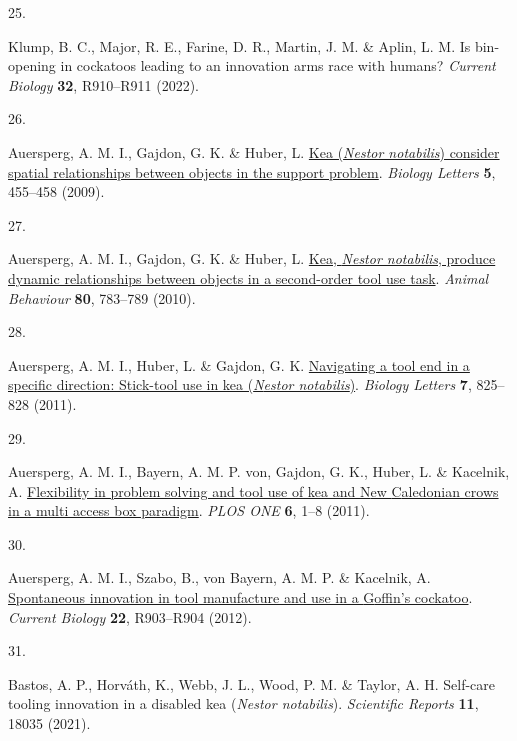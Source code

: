 \documentclass[
  man,floatsintext]{apa6}
\newlength{\cslhangindent}
\newlength{\csllabelwidth}
\newlength{\cslentryspacingunit} %
\newenvironment{CSLReferences}[2] %
 {%
  \setlength{\parindent}{0pt}
  \ifodd #1
  \let\oldpar\par
  \def\par{\hangindent=\cslhangindent\oldpar}
  \fi
  \setlength{\parskip}{#2\cslentryspacingunit}
 }%
 {}
\newcommand{\CSLLeftMargin}[1]{\parbox[t]{\csllabelwidth}{#1}}
\newcommand{\CSLRightInline}[1]{\parbox[t]{\linewidth - \csllabelwidth}{#1}\break}
\begin{document}
\begin{CSLReferences}{0}{0}
\leavevmode{}%
\CSLLeftMargin{25. }%
\CSLRightInline{Klump, B. C., Major, R. E., Farine, D. R., Martin, J. M. \& Aplin, L. M. Is bin-opening in cockatoos leading to an innovation arms race with humans? \emph{Current Biology} \textbf{32}, R910--R911 (2022).}

\leavevmode{}%
\CSLLeftMargin{26. }%
\CSLRightInline{Auersperg, A. M. I., Gajdon, G. K. \& Huber, L. \href{https://doi.org/10.1098/rsbl.2009.0114}{Kea (\emph{{N}estor notabilis}) consider spatial relationships between objects in the support problem}. \emph{Biology Letters} \textbf{5}, 455--458 (2009).}

\leavevmode{}%
\CSLLeftMargin{27. }%
\CSLRightInline{Auersperg, A. M. I., Gajdon, G. K. \& Huber, L. \href{https://doi.org/10.1016/j.anbehav.2010.08.007}{Kea, \emph{{N}estor notabilis}, produce dynamic relationships between objects in a second-order tool use task}. \emph{Animal Behaviour} \textbf{80}, 783--789 (2010).}

\leavevmode{}%
\CSLLeftMargin{28. }%
\CSLRightInline{Auersperg, A. M. I., Huber, L. \& Gajdon, G. K. \href{https://doi.org/10.1098/rsbl.2011.0388}{Navigating a tool end in a specific direction: Stick-tool use in kea (\emph{{N}estor notabilis})}. \emph{Biology Letters} \textbf{7}, 825--828 (2011).}

\leavevmode{}%
\CSLLeftMargin{29. }%
\CSLRightInline{Auersperg, A. M. I., Bayern, A. M. P. von, Gajdon, G. K., Huber, L. \& Kacelnik, A. \href{https://doi.org/10.1371/journal.pone.0020231}{Flexibility in problem solving and tool use of kea and {N}ew {C}aledonian crows in a multi access box paradigm}. \emph{PLOS ONE} \textbf{6}, 1--8 (2011).}

\leavevmode{}%
\CSLLeftMargin{30. }%
\CSLRightInline{Auersperg, A. M. I., Szabo, B., von Bayern, A. M. P. \& Kacelnik, A. \href{https://doi.org/10.1016/j.cub.2012.09.002}{Spontaneous innovation in tool manufacture and use in a {G}offin's cockatoo}. \emph{Current Biology} \textbf{22}, R903--R904 (2012).}

\leavevmode{}%
\CSLLeftMargin{31. }%
\CSLRightInline{Bastos, A. P., Horváth, K., Webb, J. L., Wood, P. M. \& Taylor, A. H. Self-care tooling innovation in a disabled kea (\emph{{N}estor notabilis}). \emph{Scientific Reports} \textbf{11}, 18035 (2021).}


\end{CSLReferences}
\end{document}

